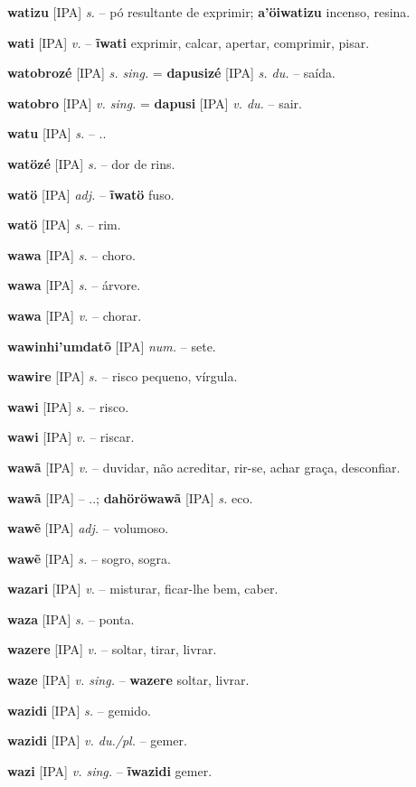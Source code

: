 \textbf{watizu} [IPA] \textit{s.} -- pó resultante de exprimir; \textbf{a'öiwatizu} incenso, resina.

\textbf{wati} [IPA] \textit{v.} -- \textbf{ĩwati} exprimir, calcar, apertar, comprimir, pisar.

\textbf{watobrozé} [IPA] \textit{s. sing.} = \textbf{dapusizé} [IPA] \textit{s. du.} -- saída.

\textbf{watobro} [IPA] \textit{v. sing.} = \textbf{dapusi} [IPA] \textit{v. du.} -- sair.

\textbf{watu} [IPA] \textit{s.} -- ..

\textbf{watözé} [IPA] \textit{s.} -- dor de rins.

\textbf{watö} [IPA] \textit{adj.} -- \textbf{ĩwatö} fuso.

\textbf{watö} [IPA] \textit{s.} -- rim.

\textbf{wawa} [IPA] \textit{s.} -- choro.

\textbf{wawa} [IPA] \textit{s.} -- árvore.

\textbf{wawa} [IPA] \textit{v.} -- chorar.

\textbf{wawinhi'umdatõ} [IPA] \textit{num.} -- sete.

\textbf{wawire} [IPA] \textit{s.} -- risco pequeno, vírgula.

\textbf{wawi} [IPA] \textit{s.} -- risco.

\textbf{wawi} [IPA] \textit{v.} -- riscar.

\textbf{wawã} [IPA] \textit{v.} -- duvidar, não acreditar, rir-se, achar graça, desconfiar.

\textbf{wawã} [IPA] \textit{} -- ..; \textbf{dahöröwawã} [IPA] \textit{s.} eco.

\textbf{wawẽ} [IPA] \textit{adj.} -- volumoso.

\textbf{wawẽ} [IPA] \textit{s.} -- sogro, sogra.

\textbf{wazari} [IPA] \textit{v.} -- misturar, ficar-lhe bem, caber.

\textbf{waza} [IPA] \textit{s.} -- ponta.

\textbf{wazere} [IPA] \textit{v.} -- soltar, tirar, livrar.

\textbf{waze} [IPA] \textit{v. sing.} -- \textbf{wazere} soltar, livrar.

\textbf{wazidi} [IPA] \textit{s.} -- gemido.

\textbf{wazidi} [IPA] \textit{v. du./pl.} -- gemer.

\textbf{wazi} [IPA] \textit{v. sing.} -- \textbf{ĩwazidi} gemer.

